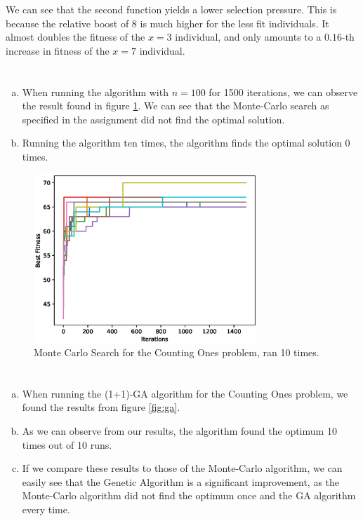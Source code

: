 \documentclass[11pt]{article}
\begin{document}
We can see that the second function yields a lower selection pressure. This is because the relative boost of 8 is much higher for the less fit individuals. It almost doubles the fitness of the $x=3$ individual, and only amounts to a $0.16$-th increase in fitness of the $x=7$ individual.

\section{}
\begin{enumerate}[(a)]
\item When running the algorithm with $n=100$ for 1500 iterations, we can observe the result found in figure \ref{fig:mc}. We can see that the Monte-Carlo search as specified in the assignment did not find the optimal solution.

\item Running the algorithm ten times, the algorithm finds the optimal solution 0 times.

\end{enumerate}

\begin{figure}[H]
\centering
\includegraphics[width=0.75\textwidth]{images/monte_carlo.eps}
\caption{Monte Carlo Search for the Counting Ones problem, ran 10 times.}
\label{fig:mc}
\end{figure}

\section{}
\begin{enumerate}[(a)]
\item When running the (1+1)-GA algorithm for the Counting Ones problem, we found the results from figure \ref{fig:ga}.
\item As we can observe from our results, the algorithm found the optimum 10 times out of 10 runs.
\item If we compare these results to those of the Monte-Carlo algorithm, we can easily see that the Genetic Algorithm is a significant improvement, as the Monte-Carlo algorithm did not find the optimum once and the GA algorithm every time.
\end{enumerate}
\end{document}
